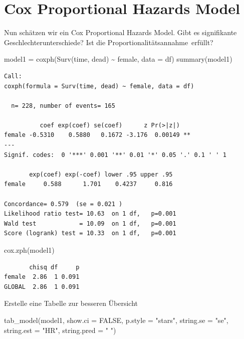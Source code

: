 \documentclass[
  letterpaper,
  DIV=11,
  numbers=noendperiod]{scrartcl}
\newenvironment{Shaded}{\begin{snugshade}}{\end{snugshade}}
\newcommand{\AttributeTok}[1]{\textcolor[rgb]{0.40,0.45,0.13}{#1}}
\newcommand{\ConstantTok}[1]{\textcolor[rgb]{0.56,0.35,0.01}{#1}}
\newcommand{\FunctionTok}[1]{\textcolor[rgb]{0.28,0.35,0.67}{#1}}
\newcommand{\NormalTok}[1]{\textcolor[rgb]{0.00,0.23,0.31}{#1}}
\newcommand{\OtherTok}[1]{\textcolor[rgb]{0.00,0.23,0.31}{#1}}
\newcommand{\SpecialCharTok}[1]{\textcolor[rgb]{0.37,0.37,0.37}{#1}}
\newcommand{\StringTok}[1]{\textcolor[rgb]{0.13,0.47,0.30}{#1}}
\begin{document}
\section{Cox Proportional Hazards
Model}\label{cox-proportional-hazards-model}

Nun schätzen wir ein Cox Proportional Hazards Model. Gibt es
signifikante Geschlechterunterschiede? Ist die
Proportionalitätsannahme~erfüllt?

\begin{Shaded}
\begin{Highlighting}[]
\NormalTok{model1 }\OtherTok{=} \FunctionTok{coxph}\NormalTok{(}\FunctionTok{Surv}\NormalTok{(time, dead) }\SpecialCharTok{\textasciitilde{}}\NormalTok{ female, }\AttributeTok{data =}\NormalTok{ df)}
\FunctionTok{summary}\NormalTok{(model1)}
\end{Highlighting}
\end{Shaded}

\begin{verbatim}
Call:
coxph(formula = Surv(time, dead) ~ female, data = df)

  n= 228, number of events= 165 

          coef exp(coef) se(coef)      z Pr(>|z|)   
female -0.5310    0.5880   0.1672 -3.176  0.00149 **
---
Signif. codes:  0 '***' 0.001 '**' 0.01 '*' 0.05 '.' 0.1 ' ' 1

       exp(coef) exp(-coef) lower .95 upper .95
female     0.588      1.701    0.4237     0.816

Concordance= 0.579  (se = 0.021 )
Likelihood ratio test= 10.63  on 1 df,   p=0.001
Wald test            = 10.09  on 1 df,   p=0.001
Score (logrank) test = 10.33  on 1 df,   p=0.001
\end{verbatim}

\begin{Shaded}
\begin{Highlighting}[]
\FunctionTok{cox.zph}\NormalTok{(model1)}
\end{Highlighting}
\end{Shaded}

\begin{verbatim}
       chisq df     p
female  2.86  1 0.091
GLOBAL  2.86  1 0.091
\end{verbatim}

Erstelle eine Tabelle zur besseren Übersicht

\begin{Shaded}
\begin{Highlighting}[]
\FunctionTok{tab\_model}\NormalTok{(model1,}
          \AttributeTok{show.ci =} \ConstantTok{FALSE}\NormalTok{, }\AttributeTok{p.style =} \StringTok{"stars"}\NormalTok{,}
          \AttributeTok{string.se =} \StringTok{"se"}\NormalTok{, }\AttributeTok{string.est =} \StringTok{"HR"}\NormalTok{,}
          \AttributeTok{string.pred =} \StringTok{" "}\NormalTok{)}
\end{Highlighting}
\end{Shaded}
\end{document}

